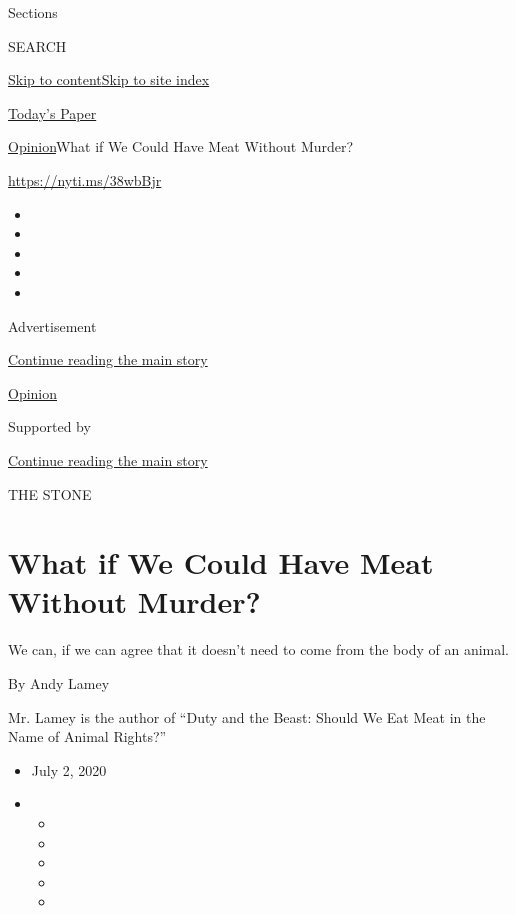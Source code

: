 Sections

SEARCH

\protect\hyperlink{site-content}{Skip to
content}\protect\hyperlink{site-index}{Skip to site index}

\href{https://myaccount.nytimes3xbfgragh.onion/auth/login?response_type=cookie\&client_id=vi}{}

\href{https://www.nytimes3xbfgragh.onion/section/todayspaper}{Today's
Paper}

\href{/section/opinion}{Opinion}\textbar{}What if We Could Have Meat
Without Murder?

\url{https://nyti.ms/38wbBjr}

\begin{itemize}
\item
\item
\item
\item
\item
\end{itemize}

Advertisement

\protect\hyperlink{after-top}{Continue reading the main story}

\href{/section/opinion}{Opinion}

Supported by

\protect\hyperlink{after-sponsor}{Continue reading the main story}

THE STONE

\hypertarget{what-if-we-could-have-meat-without-murder}{%
\section{What if We Could Have Meat Without
Murder?}\label{what-if-we-could-have-meat-without-murder}}

We can, if we can agree that it doesn't need to come from the body of an
animal.

By Andy Lamey

Mr. Lamey is the author of ``Duty and the Beast: Should We Eat Meat in
the Name of Animal Rights?''

\begin{itemize}
\item
  July 2, 2020
\item
  \begin{itemize}
  \item
  \item
  \item
  \item
  \item
  \end{itemize}
\end{itemize}

